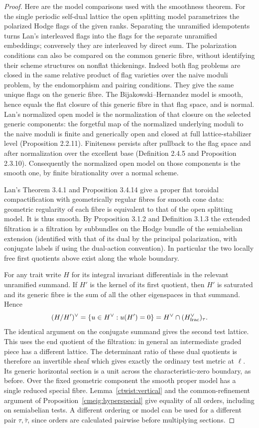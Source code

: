 \begin{proof}
Here are the model comparisons used with the smoothness theorem.
For the single periodic self-dual lattice the open splitting model
parametrizes the polarized Hodge flags of the given ranks. Separating
the unramified idempotents turns Lan's interleaved flags into
the flags for the separate unramified embeddings; conversely they
are interleaved by direct sum. The polarization conditions can
also be compared on the common generic fibre, without identifying
their scheme structures on nonflat thickenings. Indeed both flag
problems are closed in the same relative product of flag varieties
over the naive moduli problem, by the endomorphism and pairing
conditions. They give the same unique flags on the generic fibre.
The Bijakowski--Hernandez model is smooth, hence equals the flat
closure of this generic fibre in that flag space, and is normal.
Lan's normalized open model is the normalization of that closure
on the selected generic components: the forgetful map of the
normalized underlying moduli to the naive moduli is finite and
generically open and closed at full lattice-stabilizer level
(Proposition 2.2.11). Finiteness persists after pullback to the
flag space and after normalization over the excellent base
(Definition 2.4.5 and Proposition 2.3.10). Consequently the normalized
open model on those components is the smooth one, by finite
birationality over a normal scheme.

Lan's Theorem 3.4.1 and Proposition 3.4.14 give a proper flat
toroidal compactification with geometrically regular fibres for
smooth cone data: geometric regularity of each fibre is
equivalent to that of the open splitting model. It is thus smooth.
By Proposition 3.1.2 and Definition 3.1.3 the extended filtration
is a filtration by subbundles on the Hodge bundle of the
semiabelian extension (identified with that of its dual by the
principal polarization, with conjugate labels if using the
dual-action convention). In particular the two locally free
first quotients above exist along the whole boundary.

For any trait write \(H\) for its integral invariant
differentials in the relevant unramified summand. If \(H'\) is
the kernel of its first quotient, then \(H'\) is saturated and
its generic fibre is the sum of all the other eigenspaces in
that summand. Hence
\[
   (H/H')^\vee=\{u\in H^\vee:u(H')=0\}
           =H^\vee\cap (H^\vee_{\rm frac})_\tau .
\]
The identical argument on the conjugate summand gives the
second test lattice. This uses the end quotient of the
filtration: in general an intermediate graded piece has a
different lattice. The determinant ratio of these dual quotients
is therefore an invertible sheaf which gives exactly the
ordinary test metric at \(\ell\). Its generic horizontal section
is a unit across the characteristic-zero boundary, as before.
Over the fixed geometric component the smooth proper model
has a single reduced special fibre. Lemma~\ref{ctwist:vertical}
and the common-refinement argument of
Proposition~\ref{cmeig:hyperspecial} give equality of all orders,
including on semiabelian tests. A different ordering or model
can be used for a different pair \(\tau,\bar\tau\), since orders
are calculated pairwise before multiplying sections.


\end{proof}
